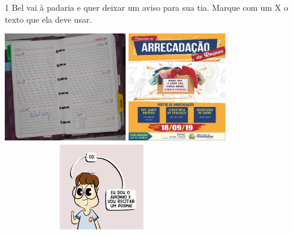

\num{1} Bel vai à padaria e quer deixar um aviso para sua tia. 
Marque com um X o texto que ela deve usar.


\includegraphics[width=2.10625in,height=1.86042in]{media/image93.jpeg}
\includegraphics[width=1.68611in,height=1.86042in]{media/image94.jpeg}
\includegraphics[width=3.36528in,height=1.53611in]{media/image97.png}



